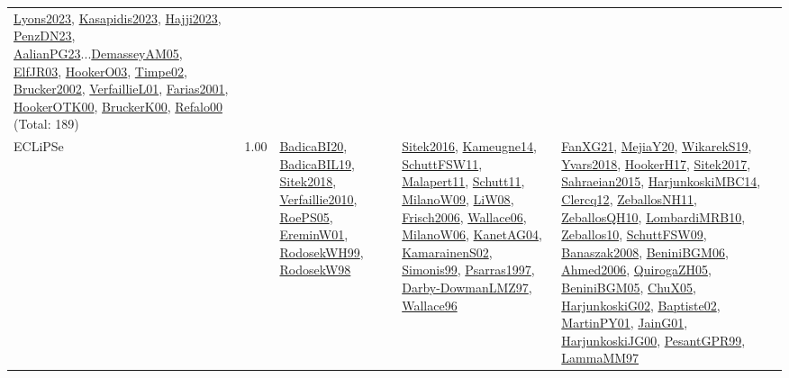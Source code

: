 {\begin{longtable}{p{3cm}r>{\raggedright\arraybackslash}p{6cm}>{\raggedright\arraybackslash}p{6cm}>{\raggedright\arraybackslash}p{8cm}}
\hyperref[detail:Lyons2023]{Lyons2023}, \hyperref[detail:Kasapidis2023]{Kasapidis2023}, \hyperref[detail:Hajji2023]{Hajji2023}, \hyperref[detail:PenzDN23]{PenzDN23}, \hyperref[detail:AalianPG23]{AalianPG23}...\hyperref[detail:DemasseyAM05]{DemasseyAM05}, \hyperref[detail:ElfJR03]{ElfJR03}, \hyperref[detail:HookerO03]{HookerO03}, \hyperref[detail:Timpe02]{Timpe02}, \hyperref[detail:Brucker2002]{Brucker2002}, \hyperref[detail:VerfaillieL01]{VerfaillieL01}, \hyperref[detail:Farias2001]{Farias2001}, \hyperref[detail:HookerOTK00]{HookerOTK00}, \hyperref[detail:BruckerK00]{BruckerK00}, \hyperref[detail:Refalo00]{Refalo00} (Total: 189)\\
\index{ECLiPSe}\index{CPSystems!ECLiPSe}ECLiPSe &  1.00 & \hyperref[detail:BadicaBI20]{BadicaBI20}, \hyperref[detail:BadicaBIL19]{BadicaBIL19}, \hyperref[detail:Sitek2018]{Sitek2018}, \hyperref[detail:Verfaillie2010]{Verfaillie2010}, \hyperref[detail:RoePS05]{RoePS05}, \hyperref[detail:EreminW01]{EreminW01}, \hyperref[detail:RodosekWH99]{RodosekWH99}, \hyperref[detail:RodosekW98]{RodosekW98} & \hyperref[detail:Sitek2016]{Sitek2016}, \hyperref[detail:Kameugne14]{Kameugne14}, \hyperref[detail:SchuttFSW11]{SchuttFSW11}, \hyperref[detail:Malapert11]{Malapert11}, \hyperref[detail:Schutt11]{Schutt11}, \hyperref[detail:MilanoW09]{MilanoW09}, \hyperref[detail:LiW08]{LiW08}, \hyperref[detail:Frisch2006]{Frisch2006}, \hyperref[detail:Wallace06]{Wallace06}, \hyperref[detail:MilanoW06]{MilanoW06}, \hyperref[detail:KanetAG04]{KanetAG04}, \hyperref[detail:KamarainenS02]{KamarainenS02}, \hyperref[detail:Simonis99]{Simonis99}, \hyperref[detail:Psarras1997]{Psarras1997}, \hyperref[detail:Darby-DowmanLMZ97]{Darby-DowmanLMZ97}, \hyperref[detail:Wallace96]{Wallace96} & \hyperref[detail:FanXG21]{FanXG21}, \hyperref[detail:MejiaY20]{MejiaY20}, \hyperref[detail:WikarekS19]{WikarekS19}, \hyperref[detail:Yvars2018]{Yvars2018}, \hyperref[detail:HookerH17]{HookerH17}, \hyperref[detail:Sitek2017]{Sitek2017}, \hyperref[detail:Sahraeian2015]{Sahraeian2015}, \hyperref[detail:HarjunkoskiMBC14]{HarjunkoskiMBC14}, \hyperref[detail:Clercq12]{Clercq12}, \hyperref[detail:ZeballosNH11]{ZeballosNH11}, \hyperref[detail:ZeballosQH10]{ZeballosQH10}, \hyperref[detail:LombardiMRB10]{LombardiMRB10}, \hyperref[detail:Zeballos10]{Zeballos10}, \hyperref[detail:SchuttFSW09]{SchuttFSW09}, \hyperref[detail:Banaszak2008]{Banaszak2008}, \hyperref[detail:BeniniBGM06]{BeniniBGM06}, \hyperref[detail:Ahmed2006]{Ahmed2006}, \hyperref[detail:QuirogaZH05]{QuirogaZH05}, \hyperref[detail:BeniniBGM05]{BeniniBGM05}, \hyperref[detail:ChuX05]{ChuX05}, \hyperref[detail:HarjunkoskiG02]{HarjunkoskiG02}, \hyperref[detail:Baptiste02]{Baptiste02}, \hyperref[detail:MartinPY01]{MartinPY01}, \hyperref[detail:JainG01]{JainG01}, \hyperref[detail:HarjunkoskiJG00]{HarjunkoskiJG00}, \hyperref[detail:PesantGPR99]{PesantGPR99}, \hyperref[detail:LammaMM97]{LammaMM97}\\

\end{longtable}}
